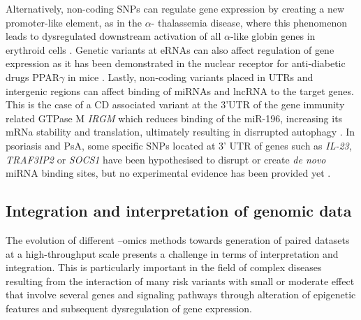 Alternatively, non-coding SNPs can regulate gene expression by creating a new promoter-like element, as in the $\alpha$- thalassemia disease, where this phenomenon leads to dysregulated downstream activation of all $\alpha$-like globin genes in erythroid cells \parencite{Gobbi2006}. Genetic variants at eRNAs can also affect regulation of gene expression as it has been demonstrated in the nuclear receptor for anti-diabetic drugs PPAR$\gamma$ in mice \parencite{Soccio2015}. Lastly, non-coding variants placed in UTRs and intergenic regions can affect binding of miRNAs and lncRNA to the target genes. This is the case of a CD associated variant at the 3'UTR of the gene immunity related GTPase M \textit{IRGM} which reduces binding of the miR-196, increasing its mRNa stability and translation, ultimately resulting in disrrupted autophagy  \parencite{Brest2011}. In psoriasis and PsA, some specific SNPs located at 3' UTR of genes such as \textit{IL-23}, \textit{TRAF3IP2} or \textit{SOCS1} have been hypothesised to disrupt or create \textit{de novo} miRNA binding sites, but no experimental evidence has been provided yet \parencite{Pivarcsi2014}. 



\subsection{Integration and interpretation of genomic data}
The evolution of different –omics methods towards generation of paired datasets at a high-throughput scale presents a challenge in terms of interpretation and integration. This is particularly important in the field of complex diseases resulting from the interaction of many risk variants with small or moderate effect that involve several genes and signaling pathways through alteration of epigenetic features and subsequent dysregulation of gene expression.

